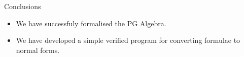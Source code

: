 \documentclass[12pt]{beamer}
\begin{document}
\begin{frame}{Conclusions}

\begin{itemize}
\item We have successfuly formalised the PG Algebra.
\item We have developed a simple verified program for converting formulae to normal forms.
\end{itemize}

\end{frame}
\end{document}
